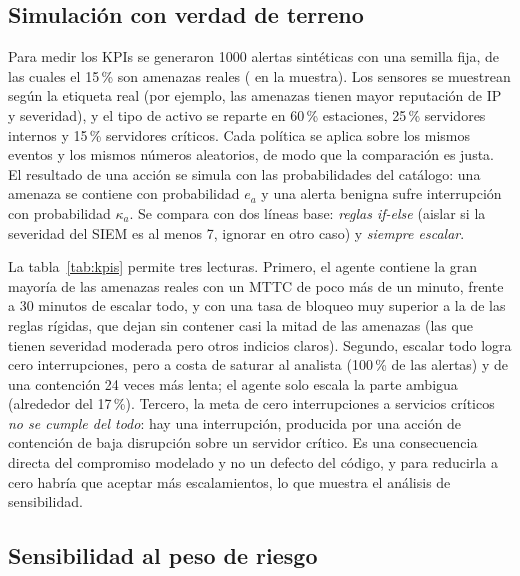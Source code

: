 \documentclass[11pt,a4paper]{article}
\begin{document}
\subsection{Simulación con verdad de terreno}

Para medir los KPIs se generaron 1000 alertas sintéticas con una semilla fija, de las cuales el 15\,\% son amenazas reales (\nAmenazas{} en la muestra). Los sensores se muestrean según la etiqueta real (por ejemplo, las amenazas tienen mayor reputación de IP y severidad), y el tipo de activo se reparte en 60\,\% estaciones, 25\,\% servidores internos y 15\,\% servidores críticos. Cada política se aplica sobre los mismos eventos y los mismos números aleatorios, de modo que la comparación es justa. El resultado de una acción se simula con las probabilidades del catálogo: una amenaza se contiene con probabilidad $e_a$ y una alerta benigna sufre interrupción con probabilidad $\kappa_a$. Se compara con dos líneas base: \emph{reglas if-else} (aislar si la severidad del SIEM es al menos 7, ignorar en otro caso) y \emph{siempre escalar}.

\begin{table}[H]
\centering
\caption{KPIs sobre 1000 alertas simuladas (semilla 42). FP = falsos positivos con acción disruptiva efectiva.}\label{tab:kpis}
\scriptsize

\end{table}

La tabla~\ref{tab:kpis} permite tres lecturas. Primero, el agente contiene la gran mayoría de las amenazas reales con un MTTC de poco más de un minuto, frente a 30 minutos de escalar todo, y con una tasa de bloqueo muy superior a la de las reglas rígidas, que dejan sin contener casi la mitad de las amenazas (las que tienen severidad moderada pero otros indicios claros). Segundo, escalar todo logra cero interrupciones, pero a costa de saturar al analista (100\,\% de las alertas) y de una contención 24 veces más lenta; el agente solo escala la parte ambigua (alrededor del 17\,\%). Tercero, la meta de cero interrupciones a servicios críticos \emph{no se cumple del todo}: hay una interrupción, producida por una acción de contención de baja disrupción sobre un servidor crítico. Es una consecuencia directa del compromiso modelado y no un defecto del código, y para reducirla a cero habría que aceptar más escalamientos, lo que muestra el análisis de sensibilidad.

\subsection{Sensibilidad al peso de riesgo}
\end{document}
